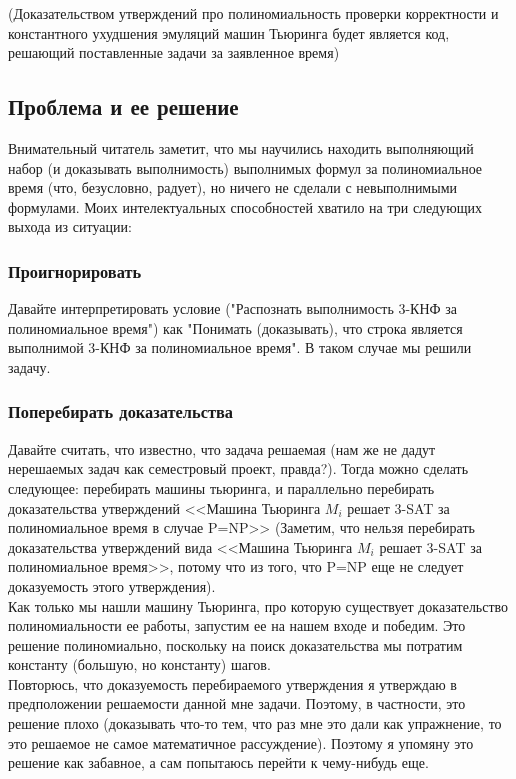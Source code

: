 \documentclass[paper=a4, fontsize=11pt]{scrartcl}
\begin{document}
(Доказательством утверждений про полиномиальность проверки корректности и
константного ухудшения эмуляций машин Тьюринга будет является код, решающий
поставленные задачи за заявленное время)


\subsection{Проблема и ее решение}


Внимательный читатель заметит, что мы научились находить выполняющий набор
(и доказывать выполнимость) выполнимых формул за полиномиальное время (что,
безусловно, радует), но ничего не сделали с невыполнимыми формулами. Моих
интелектуальных способностей хватило на три следующих выхода из ситуации:


\subsubsection{Проигнорировать}


Давайте интерпретировать условие ("Распознать выполнимость 3-КНФ за
полиномиальное время") как "Понимать (доказывать), что строка является
выполнимой 3-КНФ за полиномиальное время". В таком случае мы решили задачу.

\subsubsection{Поперебирать доказательства}


Давайте считать, что известно, что задача решаемая (нам же не дадут нерешаемых
задач как семестровый проект, правда?). Тогда можно сделать следующее:
перебирать машины тьюринга, и параллельно перебирать
доказательства утверждений <<Машина Тьюринга $M_i$ решает 3-SAT за полиномиальное
время в случае P=NP>> (Заметим, что нельзя перебирать доказательства утверждений
вида <<Машина Тьюринга $M_i$ решает 3-SAT за полиномиальное время>>,
потому что из того, что P=NP еще не следует доказуемость этого утверждения).\\


Как только мы нашли машину Тьюринга, про которую существует доказательство
полиномиальности ее работы, запустим ее на нашем входе и победим.
Это решение полиномиально, поскольку на поиск доказательства мы потратим
константу (большую, но константу) шагов. \\

Повторюсь, что доказуемость перебираемого утверждения я утверждаю в
предположении решаемости данной мне задачи. Поэтому, в частности, это решение
плохо (доказывать что-то тем, что раз мне это дали как упражнение, то это
решаемое не самое математичное рассуждение). Поэтому я упомяну это решение как
забавное, а сам попытаюсь перейти к чему-нибудь еще.
\end{document}
